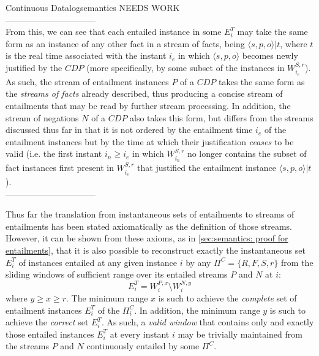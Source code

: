 \begin{nestedsection}{Continuous Datalog}{semantics}
NEEDS WORK\\
--------------------------------\\
From this, we can see that each entailed instance in some
$E^T_{i}$ may take the same form as an instance of any other fact in a
stream of facts, being $\langle s, p, o \rangle | t$, where $t$ is
the real time associated with the instant $i_{e}$ in which
$\langle s, p, o \rangle$ becomes newly justified by the ${CDP}$ (more
specifically, by some subset of the instances in $W^{S,r}_{i_{e}}$).
As such, the stream of entailment instances $P$ of a ${CDP}$ takes
the same form as the \emph{streams of facts} already described, thus
producing a concise stream of entailments that may be read by
further stream processing.  In addition, the stream of negations $N$
of a ${CDP}$ also takes this form, but differs from the streams
discussed thus far in that it is not ordered by the entailment time
$i_{e}$ of the entailment instances but by the time at which their
justification \emph{ceases} to be valid (i.e. the first instant
${i_{n} \geq i_{e}}$ in which $W^{S,r}_{i_{n}}$ no longer contains
the subset of fact instances first present in $W^{S,r}_{i_{e}}$ that
justified the entailment instance $\langle s, p, o \rangle | t$).
\\--------------------------------

Thus far the translation from instantaneous sets of entailments to
streams of entailments has been stated axiomatically as the definition
of those streams.  However, it can be shown from these axioms, as in
\ref{sec:semantics: proof for entailments}, that it is also possible
to reconstruct exactly the instantaneous set $E^T_{i}$ of instances
entailed at any given instance $i$ by any $\Pi^C = \{ R, F, S, r \}$
from the sliding windows of sufficient range over its entailed streams
$P$ and $N$ at $i$:
\[ E^T_{i} = W^{P,x}_{i} \setminus W^{N,y}_{i} \]
where ${y \geq x \geq r}$. The minimum range $x$ is such to achieve
the \emph{complete} set of entailment instances $E^T_{i}$ of the
$\Pi^C_{i}$. In addition, the minimum range $y$ is such to achieve the
\emph{correct} set $E^T_{i}$. As such, a \emph{valid window} that
contains only and exactly those entailed instances $E^T_{i}$ at every
instant $i$ may be trivially maintained from the streams $P$ and $N$
continuously entailed by some $\Pi^C$.
\end{nestedsection}
